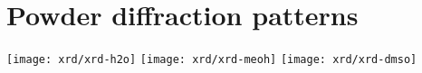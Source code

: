
\FloatBarrier%
\section{Powder diffraction patterns}\label{appx:def:xrd}

\centering
\texttt{[image: xrd/xrd-h2o]}
\texttt{[image: xrd/xrd-meoh]}
\texttt{[image: xrd/xrd-dmso]}
